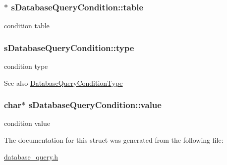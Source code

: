 \subsubsection[{\texorpdfstring{table}{table}}]{$\ast$ s\+Database\+Query\+Condition\+::table}\hypertarget{structsDatabaseQueryCondition_a5b0abcb43e1a341d7fe41cd2fb234c00}{}\label{structsDatabaseQueryCondition_a5b0abcb43e1a341d7fe41cd2fb234c00}
condition table 
\subsubsection[{\texorpdfstring{type}{type}}]{ s\+Database\+Query\+Condition\+::type}\hypertarget{structsDatabaseQueryCondition_a0d735a2c898a27fad8367293125349e6}{}\label{structsDatabaseQueryCondition_a0d735a2c898a27fad8367293125349e6}
condition type \begin{DoxySeeAlso}{See also}
\hyperlink{database__query_8h_a49f5d4b3f84e7b0e5c7a05d6c14c6ce2}{Database\+Query\+Condition\+Type} 
\end{DoxySeeAlso}
\subsubsection[{\texorpdfstring{value}{value}}]{\setlength{\rightskip}{0pt plus 5cm}char$\ast$ s\+Database\+Query\+Condition\+::value}\hypertarget{structsDatabaseQueryCondition_ad1d67fc6c2a74d0e87db06350f2f40ee}{}\label{structsDatabaseQueryCondition_ad1d67fc6c2a74d0e87db06350f2f40ee}
condition value 

The documentation for this struct was generated from the following file\+:\begin{DoxyCompactItemize}
\item 
\hyperlink{database__query_8h}{database\+\_\+query.\+h}\end{DoxyCompactItemize}
